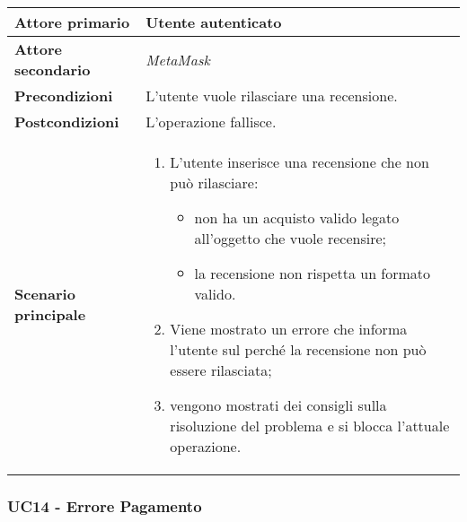             \begin{center}
                \renewcommand{\arraystretch}{1.5}
                \begin{tabular}{m{10em} m{20em}}
                    \hline
                    \textbf{Attore primario} & Utente autenticato \\
                    \hline
                    \textbf{Attore secondario} & \textit{MetaMask} \\
                    \hline
                    \textbf{Precondizioni} & L'utente vuole rilasciare una recensione. \\
                    \hline
                    \textbf{Postcondizioni} & L'operazione fallisce. \\
                    \hline
                    \textbf{Scenario principale} &
                        \begin{enumerate}
                            \item L'utente inserisce una recensione che non può rilasciare:
                            \begin{itemize}
                            \item non ha un acquisto valido legato all'oggetto che vuole recensire;
                            \item la recensione non rispetta un formato valido.
                            \end{itemize}
                            \item Viene mostrato un errore che informa l'utente sul perché la recensione non può
                            essere rilasciata;
                            \item vengono mostrati dei consigli sulla risoluzione del problema e si blocca
                            l'attuale operazione.
                        \end{enumerate} \\
                    \hline
                \end{tabular}
            \end{center}

        \subsubsection{UC14 - Errore Pagamento}
        \label{UC14}

